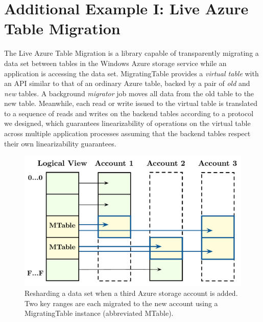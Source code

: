 \section{Additional Example I: Live Azure Table Migration}
\label{sec:cases:migration}

The Live Azure Table Migration is a library capable of transparently migrating a data set between tables in the Windows Azure storage service while an application is accessing the data set.  MigratingTable provides a \emph{virtual table} with an API similar to that of an ordinary Azure table, backed by a pair of \emph{old} and \emph{new} tables.  A background \emph{migrator} job moves all data from the old table to the new table.  Meanwhile, each read or write issued to the virtual table is translated to a sequence of reads and writes on the backend tables according to a protocol we designed, which guarantees linearizability of operations on the virtual table across multiple application processes assuming that the backend tables respect their own linearizability guarantees.

\begin{figure}[t]
\centering
\includegraphics[width=\linewidth]{img/livemigration}
\caption{Resharding a data set when a third Azure storage account is added. Two key ranges are each migrated to the new account using a MigratingTable instance (abbreviated MTable).}
\label{fig:livemigration}
\end{figure}

